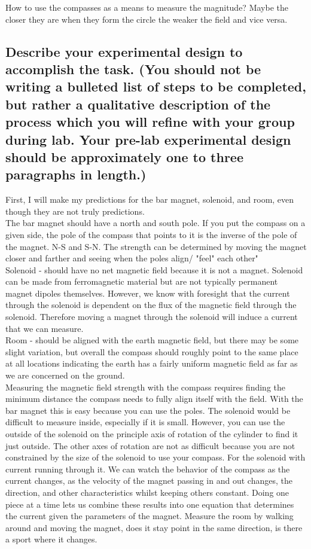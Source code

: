 \documentclass{article}
\begin{document}
   \noindent How to use the compasses as a means to measure the magnitude? Maybe the closer they are when they form the circle the weaker the field and vice versa.\\

\subsection*{Describe your experimental design to accomplish the task. (You should not be writing a bulleted list of steps to be completed, but rather a qualitative description of the process which you will refine with your group during lab. Your pre-lab experimental design should be approximately one to three paragraphs in length.)}

    First, I will make my predictions for the bar magnet, solenoid, and room, even though they are not truly predictions.\\
    
        The bar magnet should have a north and south pole. If you put the compass on a given side, the pole of the compass that points to it is the inverse of the pole of the magnet. N-S and S-N. The strength can be determined by moving the magnet closer and farther and seeing when the poles align/ "feel" each other"\\

        Solenoid - should have no net magnetic field because it is not a magnet. Solenoid can be made from ferromagnetic material but are not typically permanent magnet dipoles themselves. However, we know with foresight that the current through the solenoid is dependent on the flux of the magnetic field through the solenoid. Therefore moving a magnet through the solenoid will induce a current that we can measure.\\

        Room - should be aligned with the earth magnetic field, but there may be some slight variation, but overall the compass should roughly point to the same place at all locations indicating the earth has a fairly uniform magnetic field as far as we are concerned on the ground.\\

        Measuring the magnetic field strength with the compass requires finding the minimum distance the compass needs to fully align itself with the field. With the bar magnet this is easy because you can use the poles. The solenoid would be difficult to measure inside, especially if it is small. However, you can use the outside of the solenoid on the principle axis of rotation of the cylinder to find it just outside. The other axes of rotation are not as difficult because you are not constrained by the size of the solenoid to use your compass. For the solenoid with current running through it. We can watch the behavior of the compass as the current changes, as the velocity of the magnet passing in and out changes, the direction, and other characteristics whilst keeping others constant. Doing one piece at a time lets us combine these results into one equation that determines the current given the parameters of the magnet. Measure the room by walking around and moving the magnet, does it stay point in the same direction, is there a sport where it changes.
\end{document}
